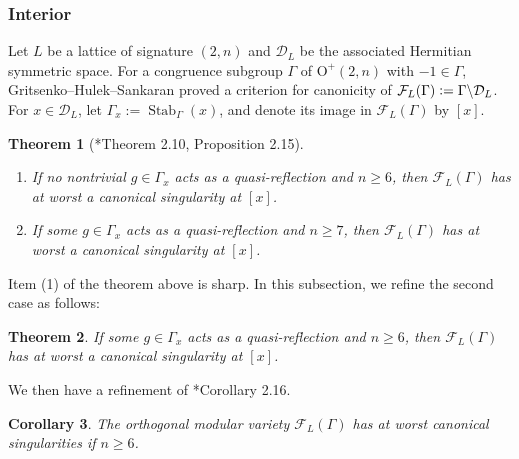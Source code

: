 \documentclass[11pt]{amsart}
\theoremstyle{plain}
\newtheorem{thm}{Theorem}[section]
\newtheorem{cor}[thm]{Corollary}
\theoremstyle{definition}
\numberwithin{equation}{section}
\def\O{\mathrm{O}}
\newcommand{\calF}{\mathcal{F}}
\newcommand{\defeq}{\vcentcolon=}
\begin{document}
\subsubsection{Interior}
Let $L$ be a lattice of signature $(2,n)$ and $\mathcal{D}_L$ be the associated Hermitian symmetric space.
For a congruence subgroup $\Gamma$ of $\O^+(2,n)$ with $-1\in\Gamma$, Gritsenko--Hulek--Sankaran proved a criterion for canonicity of $\calF_L(\Gamma)\defeq\Gamma\backslash\mathcal{D}_L$.
For $x\in\mathcal D_L$, let
$\Gamma_x:=\operatorname{Stab}_\Gamma(x)$, and denote its image
in $\mathcal F_L(\Gamma)$ by $[x]$.
\begin{thm}[{\cite{Gritsenko2007kodaira}*{Theorem 2.10, Proposition 2.15}}]\label{thm_GHS_interior}
    \begin{enumerate}
                \item[(1)] If no nontrivial $g\in\Gamma_x$ acts as a quasi-reflection and $n\geq6$, then $\calF_L(\Gamma)$ has at worst a canonical singularity at $[x]$.
        \item[(2)] If some $g \in \Gamma_x$ acts as a quasi-reflection and $n \geq 7$, then $\calF_L(\Gamma)$ has at worst a canonical singularity at $[x]$.
    \end{enumerate}
\end{thm}
Item (1) of the theorem above is sharp.
In this subsection, we refine the second case as follows:
\begin{thm}\label{thm_orth_interior}
    If some $g \in \Gamma_x$ acts as a quasi-reflection and $n \geq 6$, then $\calF_L(\Gamma)$ has at worst a canonical singularity at $[x]$.
\end{thm}
We then have a refinement of \cite{Gritsenko2007kodaira}*{Corollary 2.16}.
\begin{cor}\label{cor_orthogonal_interior}
    The orthogonal modular variety $\calF_L(\Gamma)$ has at worst canonical singularities if $n \geq 6$.
\end{cor}
\end{document}
